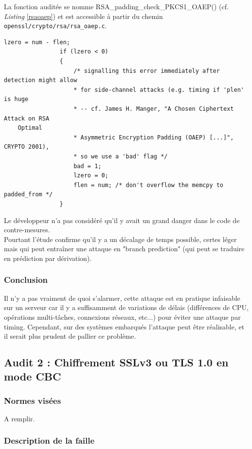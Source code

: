 			La fonction auditée se nomme RSA\_padding\_check\_PKCS1\_OAEP() (cf. \textit{Listing} \ref{rsaoaep}) et est accessible à partir du chemin \texttt{openssl/crypto/rsa/rsa\_oaep.c}.
		
		
			\begin{lstlisting}[style=customc,caption=rsa\_oaep.c,
			label=rsaoaep]
				lzero = num - flen;
				if (lzero < 0)
				{
					/* signalling this error immediately after detection might allow
					* for side-channel attacks (e.g. timing if 'plen' is huge
					* -- cf. James H. Manger, "A Chosen Ciphertext Attack on RSA
	Optimal
					* Asymmetric Encryption Padding (OAEP) [...]", CRYPTO 2001),
					* so we use a 'bad' flag */
					bad = 1;
					lzero = 0;
					flen = num; /* don't overflow the memcpy to padded_from */
				}
			\end{lstlisting}
		
			Le développeur n'a pas considéré qu'il y avait un grand danger dans le code de contre-mesures.\\
			Pourtant l'étude confirme qu'il y a un décalage de temps possible, certes léger mais qui peut entraîner une attaque en "branch prediction" (qui peut se traduire en prédiction par dérivation).\\
			
		\subsubsection{Conclusion}
		
			Il n'y a pas vraiment de quoi s'alarmer, cette attaque est en pratique infaisable sur un serveur car il y a suffisamment de variations de délais (différences de CPU, opérations multi-tâches, connexions réseaux, etc...) pour éviter une attaque par timing. Cependant, sur des systèmes embarqués l'attaque peut être réalisable, et il serait plus prudent de pallier ce problème.
			
	\subsection{Audit 2 : Chiffrement SSLv3 ou TLS 1.0 en mode CBC}
		\subsubsection{Normes visées}
	
			A remplir.	
	
		\subsubsection{Description de la faille}
			
